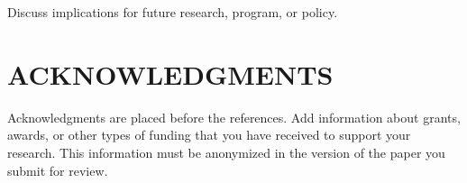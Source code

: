\documentclass[acmsmall]{acmart}
\begin{document}
Discuss implications for future research, program, or policy.

\section{ACKNOWLEDGMENTS}
Acknowledgments are placed before the references. Add information about grants, awards, or other types of funding that you have received to support your research. This information must be anonymized in the version of the paper you submit for review.  




\appendix
\end{document}
